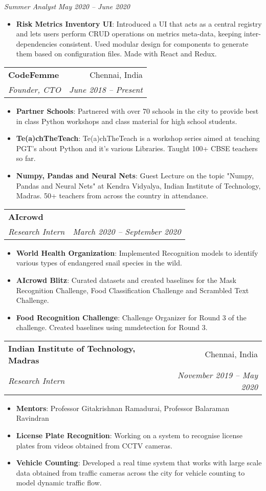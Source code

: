 \documentclass[letterpaper,11pt]{article}
\makeatletter
\newcommand{\resumeItem}[2]{
  \item\small{
    \textbf{#1}{: #2 \vspace{-2pt}}
  }
}
\newcommand{\resumeSubheading}[4]{
  \vspace{-1pt}\item
    \begin{tabular*}{0.97\textwidth}[t]{l@{\extracolsep{\fill}}r}
      \textbf{#1} & #2 \\
      \textit{\small#3} & \textit{\small #4} \\
    \end{tabular*}\vspace{-5pt}
}
\newcommand{\resumeSubSubHeading}[2]{\textit{\small #1} \hfill \textit{\small #2} }
\newcommand{\resumeItemListStart}{\begin{itemize}}
\newcommand{\resumeItemListEnd}{\end{itemize}\vspace{-5pt}}
\makeatother
\begin{document}
    \resumeSubSubHeading {Summer Analyst}{May 2020 -- June 2020}
    \resumeItemListStart
    \resumeItem{Risk Metrics Inventory UI}
        {Introduced a UI that acts as a central registry and lets users perform CRUD operations on metrics meta-data, keeping inter-dependencies consistent. Used modular design for components to generate them based on configuration files. Made with React and Redux. }
    \resumeItemListEnd

    \resumeSubheading
      {CodeFemme}{Chennai, India}
      {Founder, CTO}{June 2018 -- Present}
      \resumeItemListStart
      \resumeItem{Partner Schools}
          {Partnered with over 70 schools in the city to provide best in class Python workshops and class material for high school students.}
        \resumeItem{Te(a)chTheTeach}
          {Te(a)chTheTeach is a workshop series aimed at teaching PGT's about Python and it's various Libraries. Taught 100+ CBSE teachers so far.}
        \resumeItem{Numpy, Pandas and Neural Nets}
          {Guest Lecture on the topic "Numpy, Pandas and Neural Nets" at Kendra Vidyalya, Indian Institute of Technology, Madras. 50+ teachers from across the country in attendance.}
      \resumeItemListEnd

     \resumeSubheading
    {AIcrowd}{}
    {Research Intern}{March 2020 -- September 2020}
    \resumeItemListStart
    \resumeItem{World Health Organization}
        {Implemented Recognition models to identify various types of endangered snail species in the wild.}
    \resumeItem{AIcrowd Blitz}
        {Curated datasets and created baselines for the Mask Recognition Challenge, Food Classification Challenge and Scrambled Text Challenge.}
        \resumeItem{Food Recognition Challenge}
        {Challenge Organizer for Round 3 of the challenge. Created baselines using mmdetection for Round 3.}
    \resumeItemListEnd

    \resumeSubheading
    {Indian Institute of Technology, Madras}{Chennai, India}
    {Research Intern}{November 2019 -- May 2020}
    \resumeItemListStart
    \resumeItem{Mentors}
        {Professor Gitakrishnan Ramadurai, Professor Balaraman Ravindran}
      \resumeItem{License Plate Recognition}
        {Working on a system to recognise license plates from videos obtained from CCTV cameras.}
        \resumeItem{Vehicle Counting}
        {Developed a real time system that works with large scale data obtained from traffic cameras across the city for vehicle counting to model dynamic traffic flow.}
    \resumeItemListEnd
    
\end{document}
